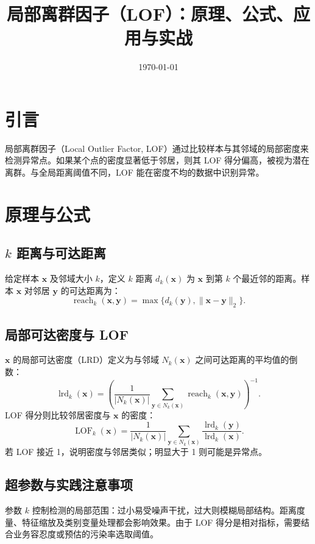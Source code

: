 \documentclass[UTF8,zihao=-4]{ctexart}
\title{局部离群因子（LOF）：原理、公式、应用与实战}
\author{}
\date{\today}
\begin{document}
\maketitle

\section{引言}
局部离群因子（Local Outlier Factor, LOF）通过比较样本与其邻域的局部密度来检测异常点。如果某个点的密度显著低于邻居，则其 LOF 得分偏高，被视为潜在离群。与全局距离阈值不同，LOF 能在密度不均的数据中识别异常。

\section{原理与公式}
\subsection{$k$ 距离与可达距离}
给定样本 \(\mathbf{x}\) 及邻域大小 \(k\)，定义 \(k\) 距离 \(d_k(\mathbf{x})\) 为 \(\mathbf{x}\) 到第 \(k\) 个最近邻的距离。样本 \(\mathbf{x}\) 对邻居 \(\mathbf{y}\) 的可达距离为：
\begin{equation}
\operatorname{reach}_k(\mathbf{x}, \mathbf{y}) = \max\{ d_k(\mathbf{y}), \lVert \mathbf{x} - \mathbf{y} \rVert_2 \}.
\end{equation}

\subsection{局部可达密度与 LOF}
\(\mathbf{x}\) 的局部可达密度（LRD）定义为与邻域 \(N_k(\mathbf{x})\) 之间可达距离的平均值的倒数：
\begin{equation}
\operatorname{lrd}_k(\mathbf{x}) = \left( \frac{1}{|N_k(\mathbf{x})|} \sum_{\mathbf{y} \in N_k(\mathbf{x})} \operatorname{reach}_k(\mathbf{x}, \mathbf{y}) \right)^{-1}.
\end{equation}
LOF 得分则比较邻居密度与 \(\mathbf{x}\) 的密度：
\begin{equation}
\operatorname{LOF}_k(\mathbf{x}) = \frac{1}{|N_k(\mathbf{x})|} \sum_{\mathbf{y} \in N_k(\mathbf{x})} \frac{\operatorname{lrd}_k(\mathbf{y})}{\operatorname{lrd}_k(\mathbf{x})}.
\end{equation}
若 LOF 接近 1，说明密度与邻居类似；明显大于 1 则可能是异常点。

\subsection{超参数与实践注意事项}
参数 \(k\) 控制检测的局部范围：过小易受噪声干扰，过大则模糊局部结构。距离度量、特征缩放及类别变量处理都会影响效果。由于 LOF 得分是相对指标，需要结合业务容忍度或预估的污染率选取阈值。
\end{document}
